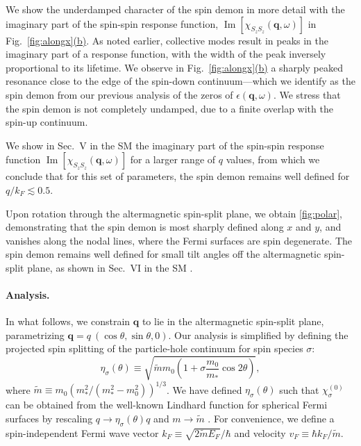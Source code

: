 \documentclass[aps,prl,reprint,twocolumns,superscriptaddress]{revtex4-2}
\DeclareMathOperator{\Imm}{Im}
\newcommand{\mdos}{\tilde{m}}
\newcommand{\kF}{k_{F}}
\newcommand{\subfigref}[2]{Fig.~\hyperref[#1]{\ref*{#1}#2}}
\begin{document}
	We show the underdamped character of the spin demon in more detail with the imaginary part of the spin-spin response function, $\Imm[\chi_{S_zS_z}(\bm q,\omega)]$ in \subfigref{fig:alongx}{(b)}. As noted earlier, collective modes result in peaks in the imaginary part of a response function, with the width of the peak inversely proportional to its lifetime. We observe in \subfigref{fig:alongx}{(b)} a sharply peaked resonance close to the edge of the spin-down continuum---which we identify as the spin demon from our previous analysis of the zeros of $\epsilon(\bm q,\omega)$. We stress that the spin demon is not completely undamped, due to a finite overlap with the spin-up continuum. 
	
	We show in Sec.~V in the SM \cite{Note1} the imaginary part of the spin-spin response function $\Imm[\chi_{S_zS_z}(\bm q,\omega)]$ for a larger range of $q$ values, from which we conclude that for this set of parameters, the spin demon remains well defined for $q/\kF\lesssim 0.5$.
	
	
	Upon rotation through the altermagnetic spin-split plane, we obtain \cref{fig:polar}, demonstrating that the spin demon is most sharply defined along $x$ and $y$, and vanishes along the nodal lines, where the Fermi surfaces are spin degenerate. 
	The spin demon remains well defined for small tilt angles off the altermagnetic spin-split plane, as shown in Sec.~VI in the SM \cite{Note1}.
	
	
	
	
	\paragraph{Analysis. }
	In what follows, we constrain $\bm q$ to lie in the altermagnetic spin-split plane, parametrizing $\bm q = q\  (\cos\theta,\sin\theta,0)$. Our analysis is simplified by defining the projected spin splitting of the particle-hole continuum for spin species $\sigma$:
	\begin{equation}
		\eta_{\sigma}(\theta) \equiv \sqrt{\mdos m_0\left( 1+\sigma \frac{m_0}{m_*}\cos2\theta\right)} \label{eq:sigma},
	\end{equation}
	where $\mdos\equiv m_0({m_*^2}/({m_*^2-m_0^2}))^{1/3}$.
	We have defined $\eta_{\sigma}(\theta)$ such that $\chi^{(0)}_\sigma$ can be obtained from the well-known Lindhard function for spherical Fermi surfaces \cite{lindhardPropertiesGasCharged1954,giulianiQuantumTheoryElectron2005} by rescaling $q\rightarrow\eta_\sigma(\theta) q$ and $m\rightarrow \mdos$ \cite{ahnAnisotropicFermionicQuasiparticles2021}. For convenience, we define a spin-independent Fermi wave vector $\kF\equiv\sqrt{2\mdos E_F}/\hbar$ and velocity $v_F\equiv \hbar k_F/\mdos$.
	
\end{document}
